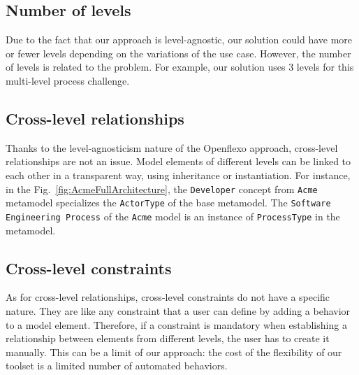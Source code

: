   \subsection{Number of levels}

  Due to the fact that our approach is level-agnostic, our solution could have
  more or fewer levels depending on the variations of the use case. However,
  the number of levels is related to the problem.  For example, our solution uses 3 levels for this multi-level process challenge.

  \subsection{Cross-level relationships}


  Thanks to the level-agnosticism nature of the Openflexo approach, cross-level
  relationships are not an issue. Model elements of different levels can be
  linked to each other in a transparent way, using inheritance or instantiation.
  For instance, in the Fig.~\ref{fig:AcmeFullArchitecture}, the
  \texttt{Developer} concept from \texttt{Acme} metamodel specializes the
  \texttt{ActorType} of the base metamodel. The \texttt{Software Engineering
  Process} of the \texttt{Acme} model is an instance of \texttt{ProcessType} in
  the metamodel.


  \subsection{Cross-level constraints}


  As for cross-level relationships, cross-level constraints do not have a
  specific nature. They are like any constraint that a user can define by adding a
  behavior to a model element. Therefore, if a constraint is mandatory when
  establishing a relationship between elements from different levels, the user
  has to create it manually. This can be a limit of our approach: the cost of
  the flexibility of our toolset is a limited number of automated behaviors.


